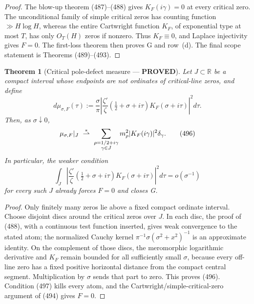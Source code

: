 \documentclass[11pt]{article}
\newtheorem{theorem}{Theorem}
\newcommand{\PROVED}{\textcolor{green!45!black}{\textbf{PROVED}}}
\begin{document}
\begin{proof}
The blow-up theorem (487)--(488) gives
\(K_F(i\gamma)=0\) at every critical zero.  The unconditional family of
simple critical zeros has counting function \(\gg H\log H\), whereas the
entire Cartwright function \(K_F\), of exponential type at most \(T\), has
only \(O_T(H)\) zeros if nonzero.  Thus \(K_F\equiv0\), and Laplace
injectivity gives \(F=0\).  The first-loss theorem then proves G and row~(d).
The final scope statement is Theorems (489)--(493).
\end{proof}

\begin{theorem}[Critical pole-defect measure --- \PROVED]
Let \(J\subset\mathbb R\) be a compact interval whose endpoints are not
ordinates of critical-line zeros, and define
\begin{equation}
 d\mu_{\sigma,F}(\tau):=\frac{\sigma}{\pi}
 \left|\frac{\zeta'}{\zeta}
 (\tfrac12+\sigma+i\tau)K_F(\sigma+i\tau)\right|^2d\tau.        \tag{495}
\end{equation}
Then, as \(\sigma\downarrow0\),
\begin{equation}
 \mu_{\sigma,F}|_J\ \buildrel *\over\rightharpoonup\
 \sum_{\substack{\rho=1/2+i\gamma\\\gamma\in J}}
 m_\rho^2|K_F(i\gamma)|^2\delta_\gamma.             \tag{496}
\end{equation}
In particular, the weaker condition
\begin{equation}
 \boxed{
 \int_J\left|\frac{\zeta'}{\zeta}
 (\tfrac12+\sigma+i\tau)K_F(\sigma+i\tau)\right|^2d\tau
 =o(\sigma^{-1})}                                    \tag{497}
\end{equation}
for every such \(J\) already forces \(F=0\) and closes G.
\end{theorem}

\begin{proof}
Only finitely many zeros lie above a fixed compact ordinate interval.
Choose disjoint discs around the critical zeros over \(J\).  In each disc,
the proof of (488), with a continuous test function inserted, gives weak
convergence to the stated atom; the normalized Cauchy kernel
\(\pi^{-1}\sigma(\sigma^2+x^2)^{-1}\) is an approximate identity.  On the
complement of those discs, the meromorphic logarithmic derivative and
\(K_F\) remain bounded for all sufficiently small \(\sigma\), because every
off-line zero has a fixed positive horizontal distance from the compact
central segment.  Multiplication by \(\sigma\) sends that part to zero.
This proves (496).  Condition (497) kills every atom, and the
Cartwright/simple-critical-zero argument of (494) gives \(F=0\).
\end{proof}
\end{document}
